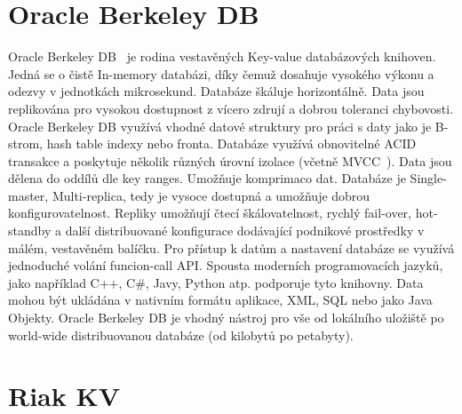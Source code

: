 \documentclass[czech,bachelor,dept460,male,csharp,cpdeclaration]{diploma}
\begin{document}
	\section{Oracle Berkeley DB}
	
	Oracle Berkeley DB~\cite{berkeleydb} je rodina vestavěných Key-value databázových knihoven. Jedná se o čistě In-memory databázi, díky čemuž dosahuje vysokého výkonu a odezvy v jednotkách mikrosekund. Databáze škáluje horizontálně. Data jsou replikována pro vysokou dostupnost z vícero zdrují a dobrou toleranci chybovosti. Oracle Berkeley DB využívá vhodné datové struktury pro práci s daty jako je B-strom, hash table indexy nebo fronta. Databáze využívá obnovitelné ACID transakce a poskytuje několik různých úrovní izolace (včetně MVCC~\cite{mvcc}). Data jsou dělena do oddílů dle key ranges. Umožňuje komprimaco dat. Databáze je Single-master, Multi-replica, tedy je vysoce dostupná a umožňuje dobrou konfigurovatelnost. Repliky umožňují čtecí škálovatelnost, rychlý fail-over, hot-standby a další distribuované konfigurace dodávající podnikové prostředky v málém, vestavěném balíčku. Pro přístup k datům a nastavení databáze se využívá jednoduché volání funcion-call API. Spousta moderních programovacích jazyků, jako například C++, C\#, Javy, Python atp. podporuje tyto knihovny. Data mohou být ukládána v nativním formátu aplikace, XML, SQL nebo jako Java Objekty. Oracle Berkeley DB je vhodný nástroj pro vše od lokálního uložiště po world-wide distribuovanou databáze (od kilobytů po petabyty).
	
	\section{Riak KV}
	
\end{document}
